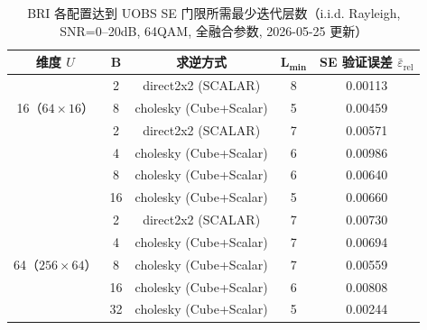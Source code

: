 \documentclass{CjC}
\begin{document}
    \begin{table}[H]
        \centering
        \caption{BRI 各配置达到 UOBS SE 门限所需最少迭代层数（i.i.d. Rayleigh,
        SNR=0--20dB, 64QAM, 全融合参数, 2026-05-25 更新）}
        \label{tab:bri-se-layers}
        \begin{tabular}{c c c c c}
            \toprule \textbf{维度 $U$}                    & $\bm{B}$ & \textbf{求逆方式}          & $\bm{L_{\min}}$ & \textbf{SE 验证误差 $\bar{\varepsilon}_{\text{rel}}$} \\
            \midrule \multirow{3}{*}{16（$64\times16$）}  & 2        & direct2x2 (SCALAR)     & 8               & 0.00113                        \\
                                                        & 8        & cholesky (Cube+Scalar) & 5               & 0.00459                        \\
            \midrule \multirow{4}{*}{32（$128\times32$）} & 2        & direct2x2 (SCALAR)     & 7               & 0.00571                        \\
                                                        & 4        & cholesky (Cube+Scalar) & 6               & 0.00986                        \\
                                                        & 8        & cholesky (Cube+Scalar) & 6               & 0.00640                        \\
                                                        & 16       & cholesky (Cube+Scalar) & 5               & 0.00660                        \\
            \midrule \multirow{5}{*}{64（$256\times64$）} & 2        & direct2x2 (SCALAR)     & 7               & 0.00730                        \\
                                                        & 4        & cholesky (Cube+Scalar) & 7               & 0.00694                        \\
                                                        & 8        & cholesky (Cube+Scalar) & 7               & 0.00559                        \\
                                                        & 16       & cholesky (Cube+Scalar) & 6               & 0.00808                        \\
                                                        & 32       & cholesky (Cube+Scalar) & 5               & 0.00244                        \\
            \bottomrule
        \end{tabular}
    \end{table}
\end{document}
